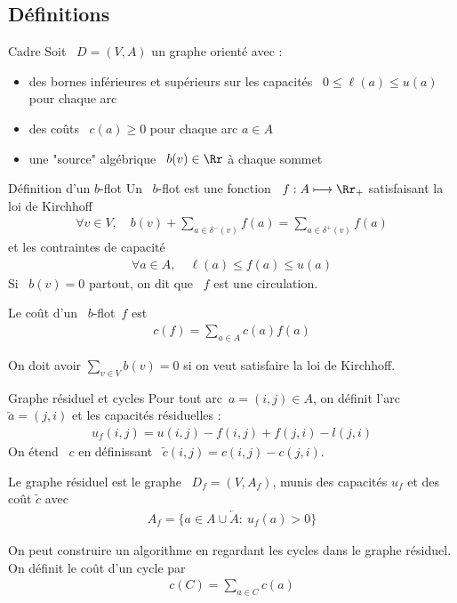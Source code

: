\documentclass{beamer}
\begin{document}
\subsection{Définitions}

\begin{frame}[t]{Cadre}  \pause
Soit ~$D = (V, A)$ un graphe orienté avec : \pause
\begin{itemize}
  \item des bornes inférieures et supérieurs sur les capacités ~$0 \leq \ell(a) \leq u(a)$ pour chaque arc \pause
  \item des coûts ~$c(a) \geq 0$ pour chaque arc $a \in A$ \pause
  \item une "source" algébrique ~$b(v) \in \Rr$ à chaque sommet
\end{itemize}

\end{frame}

\begin{frame}[t]{Définition d'un $b$-flot} \pause
  Un ~$b$-flot est une fonction ~$f: A \longmapsto \Rr_+$ satisfaisant la loi de  Kirchhoff
  \begin{align*}
    \forall v \in V, \quad b(v) + \sum_{a \in \delta^-(v)} f(a) = \sum_{a \in \delta^+(v)} f(a)
  \end{align*} \pause
  et les contraintes de capacité
  \begin{align*}
    \forall a \in A, \quad \ell(a) \leq f(a) \leq u(a)
  \end{align*} \pause
  Si ~$b(v) = 0$ partout, on dit que ~$f$ est une circulation.
  
  \medskip \pause
  
  Le coût d'un ~$b$-flot~$f$ est
  \begin{align*}
    c(f) = \sum_{a \in A} c(a) f(a)
  \end{align*}

  On doit avoir 
$\sum_{v \in V} b(v) = 0$ si on veut satisfaire la loi de Kirchhoff.
\end{frame}



\begin{frame}[t]{Graphe résiduel et cycles} \pause
  Pour tout arc~$a=(i, j) \in A$, on définit l'arc~$\overleftarrow{a} = (j, i)$ et les capacités résiduelles :
  \begin{align*}
    u_f(i,j) = u(i,j) - f(i,j)+f(j,i) -l(j,i) 
  \end{align*} \pause
  On étend ~$c$ en définissant ~$\tilde c(i,j) = c(i,j)-c(j,i)$.

\medskip \pause

  Le graphe résiduel est le graphe ~$D_f = (V, A_f)$, munis des capacités $u_f$ et des coût $\tilde c$ avec
  \begin{align*}
    A_f = \{a \in A \cup \overleftarrow{A}:~ u_f(a) > 0\} 
  \end{align*} \pause
  
  On peut construire un algorithme en regardant les cycles dans le graphe résiduel.
  On définit le coût d'un cycle par
  \begin{align*}
    c(C) = \sum_{a \in C} c(a)
  \end{align*}
\end{frame}
\end{document}
